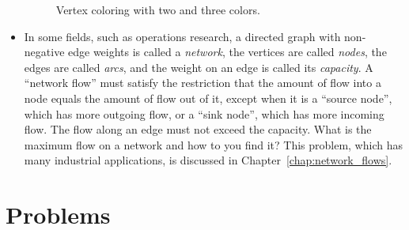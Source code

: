 \begin{itemize}
\begin{figure}[!htbp]
\centering

\caption{Vertex coloring with two and three colors.}
\label{fig:introduction:vertex_coloring}
\end{figure}

\item In some fields, such as operations research, a directed graph
  with non-negative edge weights is called a \emph{network}, the
  vertices are called \emph{nodes}, the edges are called \emph{arcs},
  and the weight on an edge is called its \emph{capacity}. A
  ``network flow'' must satisfy the restriction that the amount of
  flow into a node equals the amount of flow out of it, except when it
  is a ``source node'', which has more outgoing flow, or a ``sink
  node'', which has more incoming flow. The flow along an edge must
  not exceed the capacity. What is the maximum flow on a network
  and how to you find it? This problem, which has many industrial
  applications, is discussed in Chapter~\ref{chap:network_flows}.
\end{itemize}



\section{Problems}

